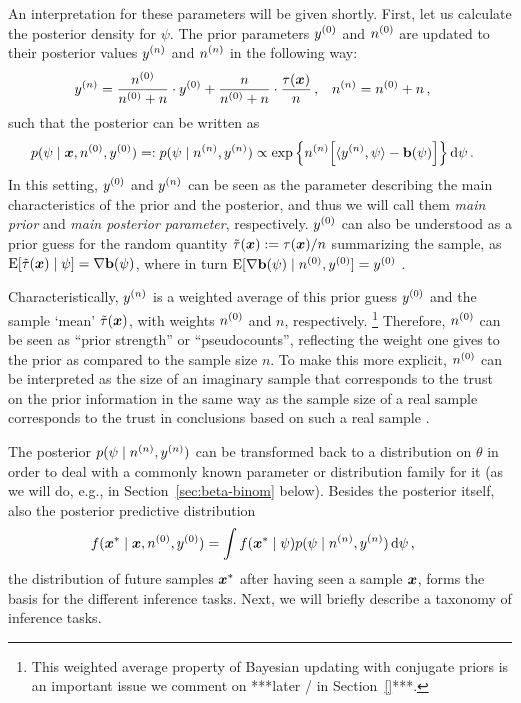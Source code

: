 An interpretation for these parameters will be given shortly.
First, let us calculate the posterior density for $\psi$.
The prior parameters $y^{(0)}$ and $n^{(0)}$ are updated to their posterior values $y^{(n)}$ and $n^{(n)}$ in the following way:
\begin{align}\label{eq:canonicalupdate}
y^{(n)} &= \frac{n^{(0)}}{n^{(0)} + n} \cdot y^{(0)} + \frac{n}{n^{(0)} + n} \cdot \frac{\tau({\bm x})}{n}\,, &
n^{(n)} &= n^{(0)} + n\,,
\end{align}
such that the posterior can be written as
\begin{align}\label{eq:canonicalposterior}
p(\psi \mid {\bm x}, n^{(0)}, y^{(0)})
 =: p(\psi \mid n^{(n)}, y^{(n)})
 &\propto \exp\Big\{ n^{(n)} \Big[ \langle y^{(n)}, \psi \rangle - \mathbf{b}(\psi) \Big] \Big\} \,\mathrm{d}\psi\,.
\end{align}
In this setting, $y^{(0)}$ and $y^{(n)}$ can be seen as the parameter describing the main characteristics of the prior and the posterior,
and thus we will call them \emph{main prior} and \emph{main posterior parameter}, respectively.
$y^{(0)}$ can also be understood as a prior guess for the random quantity $\tilde{\tau}({\bm x}) := \tau({\bm x})/n$ summarizing the sample,
as $\operatorname{E}[\tilde{\tau}({\bm x}) \mid \psi] = \nabla\mathbf{b}(\psi)$,
where in turn $\operatorname{E}[\nabla\mathbf{b}(\psi) \mid n^{(0)}, y^{(0)}] = y^{(0)}$ \parencite[e.g.,][Prop.~5.7, p.~275]{2000:bernardosmith}.

Characteristically, $y^{(n)}$ is a weighted average of this prior guess $y^{(0)}$ and the sample `mean' $\tilde{\tau}({\bm x})$,
with weights $n^{(0)}$ and $n$, respectively.%
\footnote{This weighted average property of Bayesian updating with conjugate priors is an important issue
we comment on ***later / in Section~\ref{}***.}
Therefore, $n^{(0)}$ can be seen as ``prior strength'' or ``pseudocounts'',
reflecting the weight one gives to the prior as compared to the sample size $n$.
To make this more explicit, $n^{(0)}$ can be interpreted as the size of an imaginary sample
that corresponds to the trust on the prior information in the same way
as the sample size of a real sample
corresponds to the trust in conclusions based on such a real sample \parencite[p.~258]{Walter2009a}.

The posterior $p(\psi \mid n^{(n)}, y^{(n)})$ can be transformed back to a distribution on $\theta$
in order to deal with a commonly known parameter or distribution family for it
(as we will do, e.g., in Section~\ref{sec:beta-binom} below).
Besides the posterior itself, also the posterior predictive distribution
\begin{align}
\label{eq:posteriorpredictive}
f({\bm x}^*\mid{\bm x}, n^{(0)}, y^{(0)}) &= \int f({\bm x}^* \mid \psi) p(\psi \mid n^{(n)}, y^{(n)}) \,\mathrm{d}\psi\,,
\end{align}
the distribution of future samples ${\bm x}^*$ after having seen a sample ${\bm x}$,
forms the basis for the different inference tasks. %
Next, we will briefly describe a taxonomy of inference tasks.


